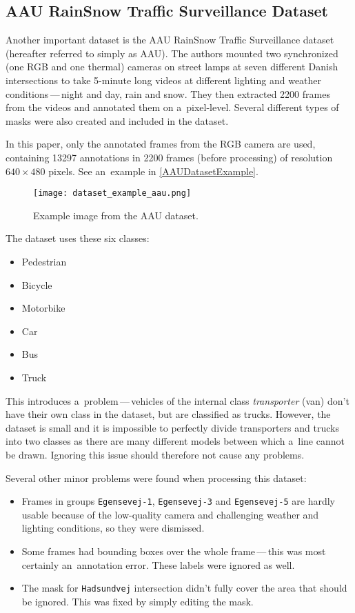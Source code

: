 \subsection{AAU RainSnow Traffic Surveillance Dataset}
\label{AAUDataset}

Another important dataset is the AAU RainSnow Traffic Surveillance
dataset~\cite{Bahnsen2019} (hereafter referred to simply as AAU). The authors
mounted two synchronized (one RGB and one thermal) cameras on street lamps at
seven different Danish intersections to take 5-minute long videos at different
lighting and weather conditions\,---\,night and day, rain and snow. They then
extracted \num{2200} frames from the videos and annotated them on a~pixel-level.
Several different types of masks were also created and included in the dataset.

In this paper, only the annotated frames from the RGB camera are used,
containing \num{13297} annotations in \num{2200} frames (before processing) of
resolution $640 \times 480$ pixels. See an~example in
\autoref{AAUDatasetExample}.

\begin{figure}[t]
    \centering
    \texttt{[image: dataset\_example\_aau.png]}
    \captionsetup{width=0.7\textwidth}
    \caption{Example image from the AAU dataset.}
    \label{AAUDatasetExample}
\end{figure}

The dataset uses these six classes:
\begin{itemize}
    \item Pedestrian
    \item Bicycle
    \item Motorbike
    \item Car
    \item Bus
    \item Truck
\end{itemize}
This introduces a~problem\,---\,vehicles of the internal class \textit{transporter}
(van) don't have their own class in the dataset, but are classified as trucks.
However, the dataset is small and it is impossible to perfectly divide
transporters and trucks into two classes as there are many different models
between which a~line cannot be drawn.  Ignoring this issue should therefore not
cause any problems.

Several other minor problems were found when processing this dataset:
\begin{itemize}
    \item Frames in groups \verb|Egensevej-1|, \verb|Egensevej-3| and
    \verb|Egensevej-5| are hardly usable because of the low-quality camera and
    challenging weather and lighting conditions, so they were dismissed.
    \item Some frames had bounding boxes over the whole frame\,---\,this was most
    certainly an~annotation error. These labels were ignored as well.
    \item The mask for \verb|Hadsundvej| intersection didn't fully cover the
    area that should be ignored. This was fixed by simply editing the mask.
\end{itemize}

